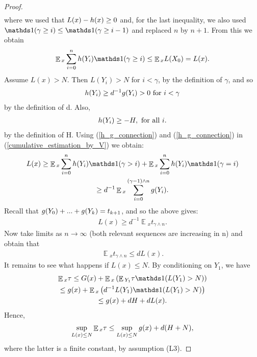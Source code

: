 \documentclass[10pt, reqno]{amsart}
\theoremstyle{definition}
\newcommand{\astVar}{\tau} %
\newcommand{\gtfVar}{G} %
\newcommand{\ltfVar}{L} %
\DeclareMathOperator*{\E}{\mathbb{E}}
\begin{document}
\begin{proof}
\begin{gather*}
		\end{gather*}
		where we used that $\ltfVar(x) - \hffVar(x) \geq 0$ and, for the last inequality, we also used $\indicator(\gamma \geq i) \leq \indicator(\gamma \geq i - 1)$ and replaced $n$ by $n+1$. From this we obtain
		\begin{gather}
		\E{}_{x}\sum_{i=0}^{n}\hffVar(Y_{i})\indicator(\gamma \geq i) \leq \E{}_{x}\ltfVar(X_{0}) = \ltfVar(x).
		\label{cumulative_estimation_by_V}
		\end{gather}
		Assume $\ltfVar(x) > N$. Then $\ltfVar(Y_{i}) > N$ for $i < \gamma$, by the definition of $\gamma$, and so
		\begin{gather}
		h(Y_{i}) \geq d^{-1}g(Y_{i}) > 0 \text{ for } i < \gamma
		\label{h_g_connection}
		\end{gather}
		by the definition of d. Also,
		\begin{gather}
		h(Y_{i}) \geq -H, \text{ for all } i.
		\label{h_estimation}
		\end{gather}
		by the definition of H. Using (\ref{h_g_connection}) and (\ref{h_g_connection}) in (\ref{cumulative_estimation_by_V}) we obtain:
		\begin{gather*}
		\ltfVar(x) \geq \E{}_{x}\sum_{i=0}^{n}\hffVar(Y_{i})\indicator(\gamma > i) + \E{}_{x}\sum_{i=0}^{n}\hffVar(Y_{i})\indicator(\gamma = i) \\ \geq d^{-1}\E{}_{x}\sum_{i=0}^{(\gamma - 1) \wedge n}\gffVar(Y_{i}).
		\end{gather*}
		Recall that $g(Y_{0}) + ... + g(Y_{k}) = t_{k+1}$, and so the above gives:
		\begin{gather*}
		\ltfVar(x) \geq d^{-1}\E{}_{x}t_{\gamma \wedge n}.
		\end{gather*}
		Now take limits as $n \xrightarrow{} \infty$ (both relevant sequences are increasing in n) and obtain that
		\begin{gather*}
		\E{}_{x}t_{\gamma \wedge n} \leq d\ltfVar(x).
		\end{gather*}
		It remains to see what happens if $\ltfVar(x) \leq N$. By conditioning on $Y_{1}$, we have
		\begin{gather*}
		\E{}_{x}\astVar \leq \gtfVar(x) + \E{}_{x}\left(\E{}_{Y_{1}}\astVar\indicator(\ltfVar(Y_{1}) > N)\right) \\ \leq \gffVar(x) + \E{}_{x}\left(d^{-1}\ltfVar(Y_{1})\indicator(\ltfVar(Y_{1}) > N)\right) \\ \leq \gffVar(x) + dH + d\ltfVar(x).
		\end{gather*}
		Hence,
		\begin{gather*}
		\sup_{\ltfVar(x) \leq N}\E{}_{x}\astVar \leq \sup_{\ltfVar(x) \leq N}\gffVar(x) + d(H +N),
		\end{gather*}
		where the latter is a finite constant, by assumption (L3).
	\end{proof}
	
\end{document}
